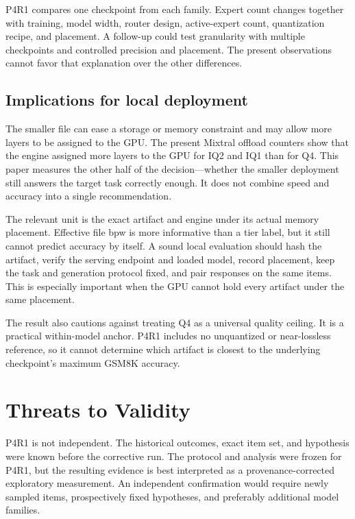 \documentclass[11pt]{article}
\begin{document}
P4R1 compares one checkpoint from each family. Expert count changes together
with training, model width, router design, active-expert count, quantization
recipe, and placement. A follow-up could test granularity with multiple
checkpoints and controlled precision and placement. The present observations
cannot favor that explanation over the other differences.

\subsection{Implications for local deployment}

The smaller file can ease a storage or memory constraint and may allow more
layers to be assigned to the GPU. The present Mixtral offload counters show
that the engine assigned more layers to the GPU for IQ2 and IQ1 than
for Q4. This paper measures the other half of the decision---whether the
smaller deployment still answers the target task correctly enough. It does
not combine speed and accuracy into a single recommendation.

The relevant unit is the exact artifact and engine under its actual memory
placement. Effective file bpw is more informative than a tier label, but it
still cannot predict accuracy by itself. A sound local evaluation should hash
the artifact, verify the serving endpoint and loaded model, record placement,
keep the task and generation protocol fixed, and pair responses on the same
items. This is especially important when the GPU cannot hold every artifact
under the same placement.

The result also cautions against treating Q4 as a universal quality ceiling.
It is a practical within-model anchor. P4R1 includes no unquantized or
near-lossless reference, so it cannot determine which artifact is closest to
the underlying checkpoint's maximum GSM8K accuracy.

\section{Threats to Validity}

P4R1 is not independent. The historical outcomes, exact item set, and
hypothesis were known before the corrective run. The protocol and analysis
were frozen for P4R1, but the resulting evidence is best interpreted as a
provenance-corrected exploratory measurement. An independent confirmation
would require newly sampled items, prospectively fixed hypotheses, and
preferably additional model families.
\end{document}
